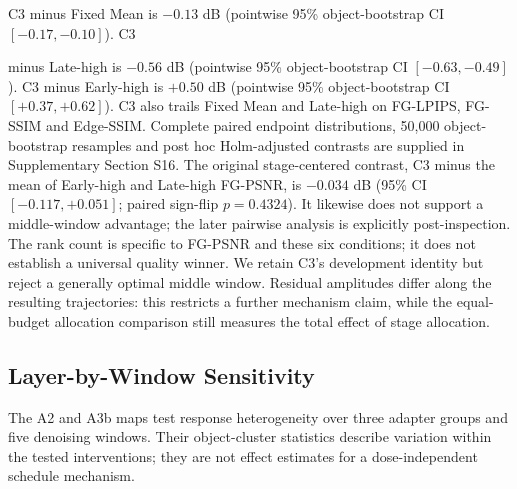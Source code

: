 \documentclass[times,twocolumn,final]{elsarticle}
\providecommand{\DIFadd}[1]{{\protect\color{blue} \sf #1}} %
\providecommand{\DIFaddbegin}{} %
\providecommand{\DIFaddend}{} %
\begin{document}
  C3   \DIFaddbegin \DIFadd{minus Fixed Mean is $-0.13$ dB (pointwise 95\% object-bootstrap CI $[-0.17,-0.10]$). }\DIFaddend C3  


 \DIFaddbegin \DIFadd{minus Late-high is $-0.56$ dB (pointwise 95\% object-bootstrap CI $[-0.63,-0.49]$). }\DIFaddend C3   \DIFaddbegin \DIFadd{minus Early-high is $+0.50$ dB (pointwise 95\% object-bootstrap CI $[+0.37,+0.62]$). C3 also trails Fixed Mean and Late-high }\DIFaddend on   \DIFaddbegin \DIFadd{FG-LPIPS, FG-SSIM and Edge-SSIM. Complete paired endpoint distributions, 50,000 object-bootstrap resamples and post hoc Holm-adjusted contrasts are supplied in Supplementary Section S16. The original stage-centered contrast, }\DIFaddend C3   \DIFaddbegin \DIFadd{minus the mean of Early-high and Late-high FG-PSNR, is $-0.034$ dB (95\% CI $[-0.117,+0.051]$; paired sign-flip $p=0.4324$). It likewise does not support a middle-window advantage; }\DIFaddend the   \DIFaddbegin \DIFadd{later pairwise analysis is explicitly post-inspection. The rank count is specific to FG-PSNR and these six conditions; it does not establish a universal quality winner. We retain C3's development identity but reject a generally optimal middle window. Residual amplitudes differ along the resulting trajectories: this restricts a further mechanism claim, while the equal-budget allocation comparison still measures the total effect of stage allocation.
}

\subsection{Layer-by-Window Sensitivity}
\label{subsec:layerwindow}

\DIFadd{The A2 and A3b maps test response heterogeneity over three adapter groups and five denoising windows. Their object-cluster statistics describe variation within the tested interventions; they are not effect estimates for a dose-independent schedule mechanism}\DIFaddend .
\end{document}
